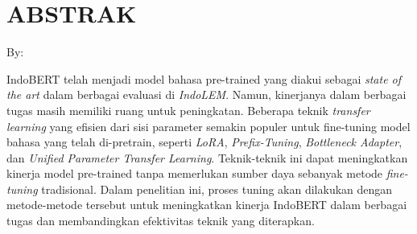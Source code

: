\clearpage
\chapter*{ABSTRAK}

\begin{center}
    \center
    \begin{singlespace}
        \large\bfseries\MakeUppercase{\thetitle}
    
        \normalfont\normalsize
        By:
    
        \bfseries \theauthor
    \end{singlespace}
\end{center} 


\begin{singlespace}
    IndoBERT telah menjadi model bahasa pre-trained yang diakui sebagai \textit{state of the art} dalam berbagai evaluasi di \textit{IndoLEM}.
    Namun, kinerjanya dalam berbagai tugas masih memiliki ruang untuk peningkatan. 
    Beberapa teknik \textit{transfer learning} yang efisien dari sisi parameter semakin populer 
    untuk fine-tuning model bahasa yang telah di-pretrain, seperti \textit{LoRA}, \textit{Prefix-Tuning}, \textit{Bottleneck Adapter}, dan \textit{Unified Parameter Transfer Learning}. 
    Teknik-teknik ini dapat meningkatkan kinerja model pre-trained tanpa memerlukan sumber daya sebanyak metode \textit{fine-tuning} tradisional. 
    Dalam penelitian ini, proses tuning akan dilakukan dengan metode-metode tersebut untuk meningkatkan kinerja IndoBERT dalam berbagai tugas dan membandingkan efektivitas teknik yang diterapkan.
\end{singlespace}
\clearpage

\clearpage
